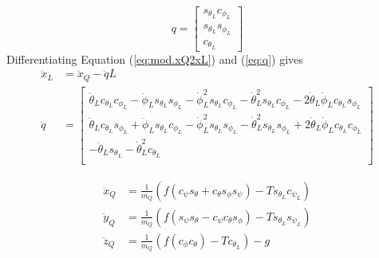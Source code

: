 \begin{equation}\label{eq:q}
q=\begin{bmatrix}
s_{\theta_L}c_{\phi_L}\\
s_{\theta_L}s_{\phi_L}\\
c_{\theta_L}
\end{bmatrix}
\end{equation}  
Differentiating Equation (\ref{eq:mod.xQ2xL}) and (\ref{eq:q}) gives
\begin{equation}\label{key}
\begin{aligned}
\ddot{x}_L&=\ddot{x}_Q-\ddot{q}L\\
\ddot{q}&=\begin{bmatrix}
\ddot{\theta}_Lc_{\theta_L}c_{\phi_L}-\ddot{\phi}_Ls_{\theta_L}s_{\phi_L}-\dot{\phi}_L^2s_{\theta_L}c_{\phi_L}-\dot{\theta}_L^2s_{\theta_L}c_{\phi_L}-2\dot{\theta}_L\dot{\phi}_Lc_{\theta_L}s_{\phi_L}\\
\ddot{\theta}_Lc_{\theta_L}s_{\phi_L}+\ddot{\phi}_Ls_{\theta_L}c_{\phi_L}-\dot{\phi}_L^2s_{\theta_L}s_{\phi_L}-\dot{\theta}_L^2s_{\theta_L}s_{\phi_L}+2\dot{\theta}_L\dot{\phi}_Lc_{\theta_L}c_{\phi_L}\\
-\ddot{\theta}_Ls_{\theta_L}-\dot{\theta}_L^2 c_{\theta_L}\\
\end{bmatrix}
\end{aligned}
\end{equation}

\begin{equation}\label{key}
\begin{aligned}
\ddot{x}_Q&=\frac{1}{m_Q}(f(c_{\psi}s_{\theta}+c_{\theta}s_{\phi}s_{\psi})-Ts_{\theta_L}c_{\psi_L})\\
\ddot{y}_Q&=\frac{1}{m_Q}(f(s_{\psi}s_{\theta}-c_{\psi}c_{\theta}s_{\phi})-Ts_{\theta_L}s_{\psi_L})\\
\ddot{z}_Q&=\frac{1}{m_Q}(f(c_{\phi}c_{\theta})-Tc_{\theta_L})-g\\
\end{aligned}
\end{equation}

